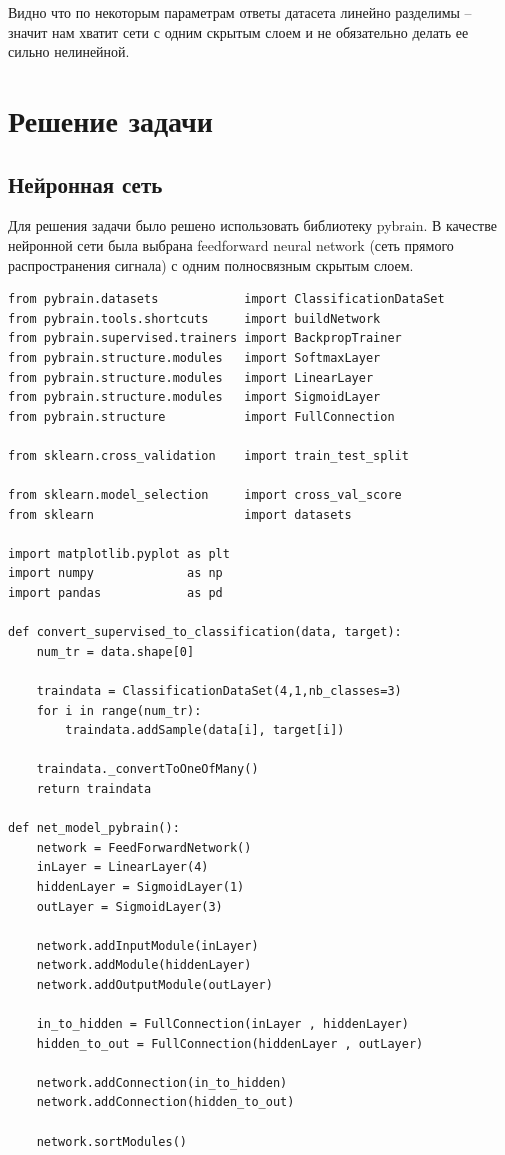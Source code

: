 \documentclass[12pt,reqno]{amsart}
\theoremstyle{definition}
\theoremstyle{remark}
\begin{document}
Видно что по некоторым параметрам ответы датасета линейно разделимы -- значит нам хватит сети с одним скрытым слоем и не обязательно делать ее сильно нелинейной.

\section{Решение задачи}

\subsection{Нейронная сеть}


Для решения задачи было решено использовать библиотеку pybrain. В качестве нейронной сети была выбрана feedforward neural network (сеть прямого распространения сигнала) с одним полносвязным скрытым слоем.
\begin{lstlisting}
from pybrain.datasets            import ClassificationDataSet
from pybrain.tools.shortcuts     import buildNetwork
from pybrain.supervised.trainers import BackpropTrainer
from pybrain.structure.modules   import SoftmaxLayer
from pybrain.structure.modules   import LinearLayer
from pybrain.structure.modules   import SigmoidLayer
from pybrain.structure           import FullConnection

from sklearn.cross_validation    import train_test_split

from sklearn.model_selection     import cross_val_score
from sklearn                     import datasets

import matplotlib.pyplot as plt
import numpy             as np
import pandas            as pd

def convert_supervised_to_classification(data, target):
    num_tr = data.shape[0]

    traindata = ClassificationDataSet(4,1,nb_classes=3)
    for i in range(num_tr):
        traindata.addSample(data[i], target[i])

    traindata._convertToOneOfMany()
    return traindata

def net_model_pybrain():
    network = FeedForwardNetwork()
    inLayer = LinearLayer(4)
    hiddenLayer = SigmoidLayer(1)
    outLayer = SigmoidLayer(3)

    network.addInputModule(inLayer)
    network.addModule(hiddenLayer)
    network.addOutputModule(outLayer)

    in_to_hidden = FullConnection(inLayer , hiddenLayer)
    hidden_to_out = FullConnection(hiddenLayer , outLayer)

    network.addConnection(in_to_hidden)
    network.addConnection(hidden_to_out)

    network.sortModules()
\end{lstlisting}
\end{document}
